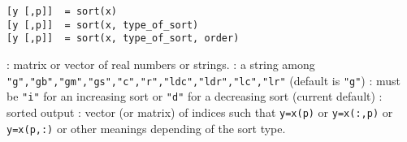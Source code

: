 
\begin{mandesc}
\end{mandesc}

\begin{calling_sequence}
\begin{verbatim}
[y [,p]]  = sort(x)
[y [,p]]  = sort(x, type_of_sort)
[y [,p]]  = sort(x, type_of_sort, order)
\end{verbatim}
\end{calling_sequence}
\begin{parameters}
  \begin{varlist}
     :  matrix or vector of real numbers or strings.
     : a string among
    \verb+"g","gb","gm","gs","c","r","ldc","ldr","lc","lr"+ (default
    is \verb+"g"+)
     : must be \verb+"i"+ for an increasing sort or \verb+"d"+ for a
                    decreasing sort (current default)
     : sorted output
     : vector (or matrix) of indices such that \verb+y=x(p)+
    or  \verb+y=x(:,p)+ or  \verb+y=x(p,:)+ or other meanings
    depending of the sort type.
  \end{varlist}
\end{parameters}

